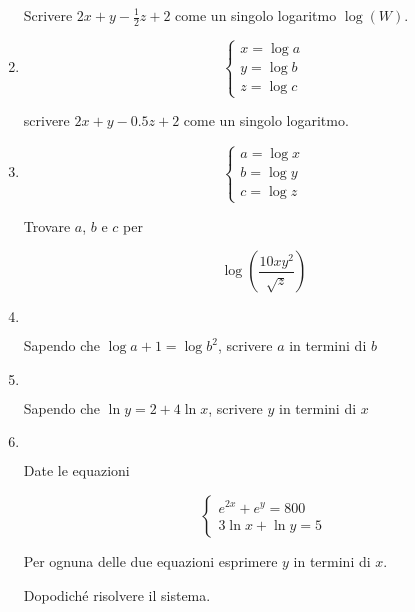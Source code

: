 \begin{enumerate}
Scrivere $2x+y-\frac{1}{2}z+2$ come un singolo logaritmo $\log(W)$.


\item

\begin{equation*}
\left\{
\begin{array}{ll}
x = \log a \\
y = \log b \\
z = \log c
\end{array}
\right.
\end{equation*}

scrivere $2x + y - 0.5z + 2$ come un singolo logaritmo.

\item 

\begin{equation*}
\left\{
\begin{array}{ll}
a = \log x \\
b = \log y \\
c = \log z
\end{array}
\right.
\end{equation*}

Trovare $a$, $b$ e $c$ per

\begin{equation*}
\log\left(
\frac{
10xy^2
}{
\sqrt{z}
}
\right)
\end{equation*}

\item $ $

Sapendo che $\log a + 1 = \log b^2$, scrivere $a$ in termini di $b$

\item $ $

Sapendo che $\ln y = 2 + 4 \ln x$, scrivere $y$ in termini di $x$

\item $ $

Date le equazioni

\begin{equation*}
\left\{
\begin{array}{ll}
e^{2x}+e^y=800\\
3\ln x+\ln y = 5
\end{array}
\right.
\end{equation*}

Per ognuna delle due equazioni esprimere $y$ in termini di $x$.

Dopodiché risolvere il sistema.


\end{enumerate}
